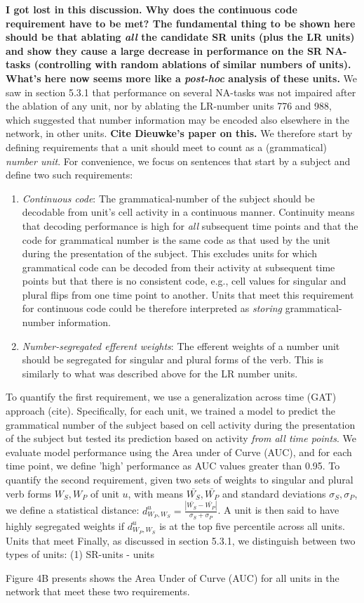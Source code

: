 \textbf{I got lost in this discussion. Why does the continuous code requirement have to be met? The fundamental thing to be shown here should be that ablating \emph{all} the candidate SR units (plus the LR units) and show they cause a large decrease in performance on the SR NA-tasks (controlling with random ablations of similar numbers of units). What's here now seems more like a \emph{post-hoc} analysis of these units.}
We saw in section 5.3.1 that performance on several NA-tasks was not impaired after the ablation of any unit, nor by ablating the LR-number units 776 and 988, which suggested that number information may be encoded also elsewhere in the network, in other units. \textbf{Cite Dieuwke's paper on this.} 
We therefore start by defining requirements that a unit should meet to count as a (grammatical) \textit{number unit}. 
For convenience, we focus on sentences that start by a subject and define two such requirements: 
\begin{enumerate}
    \item \textit{Continuous code}: The grammatical-number of the subject should be decodable from unit's cell activity in a continuous manner. Continuity means that decoding performance is high for \textit{all} subsequent time points and that the code for grammatical number is the same code as that used by the unit during the presentation of the subject. This excludes units for which grammatical code can be decoded from their activity at subsequent time points but that there is no consistent code, e.g., cell values for singular and plural flips from one time point to another. Units that meet this requirement for continuous code could be therefore interpreted as \textit{storing} grammatical-number information.

    \item \textit{Number-segregated efferent weights}: The efferent weights of a number unit should be segregated for singular and plural forms of the verb. This is similarly to what was described above for the LR number units. 

\end{enumerate}

To quantify the first requirement, we use a generalization across time (GAT) approach (cite). Specifically, for each unit, we trained a model to predict the grammatical number of the subject based on cell activity during the presentation of the subject but tested its prediction based on activity \textit{from all time points}. We evaluate model performance using the Area under of Curve (AUC), and for each time point, we define 'high' performance as AUC values greater than 0.95. To quantify the second requirement, given two sets of weights to singular and plural verb forms $W_S, W_P$ of unit $u$, with means $\bar{W_S}, \bar{W_P}$ and standard deviations $\sigma_S, \sigma_P$, we define a statistical distance: $d^u_{W_P, W_S}=\frac{|\bar{W_S}-\bar{W_P}|}{\sigma_S+\sigma_P}$. A unit is then said to have highly segregated weights if $d^u_{W_P, W_S}$ is at the top five percentile across all units. Units that meet Finally, as discussed in section 5.3.1, we distinguish between two types of units: (1) SR-units - units

Figure 4B presents shows the Area Under of Curve (AUC) for all units in the network that meet these two requirements. 



